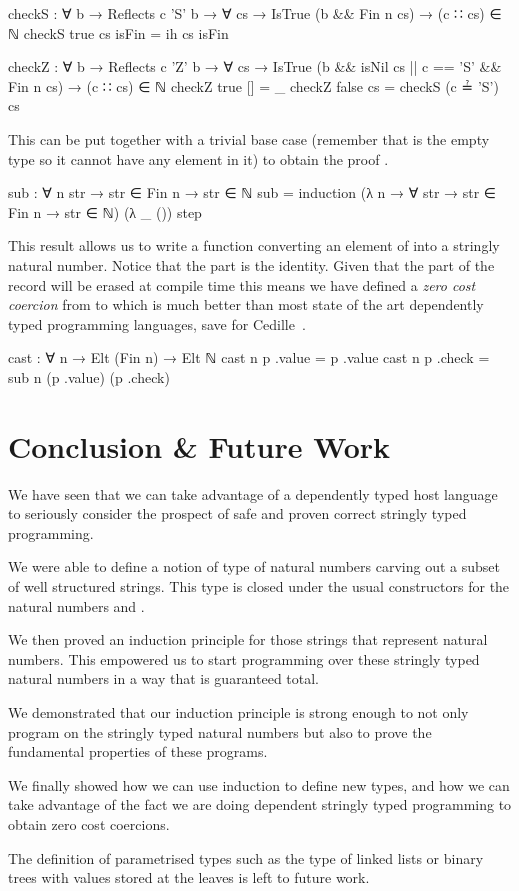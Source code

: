 \documentclass[twocolumn]{article}
\begin{document}
\begin{code}
  checkS : ∀ {b} → Reflects c 'S' b → ∀ cs →
           {{IsTrue (b && Fin n cs)}} →
           (c ∷ cs) ∈ ℕ
  checkS true cs {{isFin}} = ih cs isFin

  checkZ : ∀ {b} → Reflects c 'Z' b → ∀ cs →
    {{IsTrue (b && isNil cs || c == 'S' && Fin n cs)}} →
    (c ∷ cs) ∈ ℕ
  checkZ true  [] = _
  checkZ false cs = checkS (c ≟ 'S') cs
\end{code}

This can be put together with a trivial base case (remember that
  is the empty type so it cannot have any element
in it) to obtain the proof .

\begin{code}
sub : ∀ n str → str ∈ Fin n → str ∈ ℕ
sub = induction
        (λ n → ∀ str → str ∈ Fin n → str ∈ ℕ)
        (λ _ ())
        step
\end{code}

This result allows us to write a  function converting an
element of   into a stringly natural number. Notice
that the  part is the identity. Given that the 
part of the record will be erased at compile time this means we have
defined a \emph{zero cost coercion} from   to 
which is much better than most state of the art dependently typed
programming languages, save for
Cedille~\cite{DBLP:journals/corr/abs-1802-00787}.

\begin{code}
cast : ∀ {n} → Elt (Fin n) → Elt ℕ
cast {n} p .value = p .value
cast {n} p .check = sub n (p .value) (p .check)
\end{code}


\section{Conclusion \& Future Work}

We have seen that we can take advantage of a dependently typed
host language to seriously consider the prospect of safe and
proven correct stringly typed programming.

We were able to define a notion of type of natural numbers carving out a
subset of well structured strings. This type is closed under the usual
constructors for the natural numbers  and .

We then proved an induction principle for those strings that represent
natural numbers. This empowered us to start programming over these stringly
typed natural numbers in a way that is guaranteed total.

We demonstrated that our induction principle is strong enough to
not only program on the stringly typed natural numbers but also to prove the
fundamental properties of these programs.

We finally showed how we can use induction to define new types,
and how we can take advantage of the fact we are doing dependent
stringly typed programming to obtain zero cost coercions.

The definition of parametrised types such as the type of linked lists
or binary trees with values stored at the leaves is left to future work.


\end{document}
